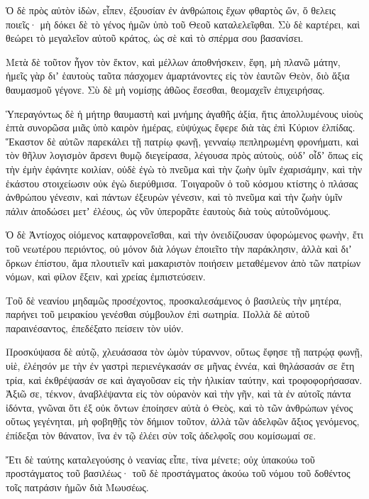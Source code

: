 {Ὁ δὲ πρὸς αὐτὸν ἰδὼν, εἶπεν, ἐξουσίαν ἐν ἀνθρώποις ἔχων φθαρτὸς ὤν, ὅ θελεις ποιεῖς· μὴ δόκει δὲ τὸ γένος ἡμῶν ὑπὸ τοῦ Θεοῦ καταλελεῖφθαι.
Σὺ δὲ καρτέρει, καὶ θεώρει τὸ μεγαλεῖον αὐτοῦ κράτος, ὡς σὲ καὶ τὸ σπέρμα σου βασανίσει.
\par }{\PP {}Μετὰ δὲ τοῦτον ἦγον τὸν ἕκτον, καὶ μέλλων ἀποθνήσκειν, ἔφη, μὴ πλανῶ μάτην, ἡμεῖς γὰρ διʼ ἑαυτοὺς ταῦτα πάσχομεν ἁμαρτάνοντες εἰς τὸν ἑαυτῶν Θεὸν, διὸ ἄξια θαυμασμοῦ γέγονε.
Σὺ δὲ μὴ νομίσῃς ἀθῶος ἔσεσθαι, θεομαχεῖν ἐπιχειρήσας.
\par }{\PP {}Ὑπεραγόντως δὲ ἡ μήτηρ θαυμαστὴ καὶ μνήμης ἀγαθῆς ἀξία, ἥτις ἀπολλυμένους υἱοὺς ἑπτὰ συνορῶσα μιᾶς ὑπὸ καιρὸν ἡμέρας, εὐψύχως ἔφερε διὰ τὰς ἐπὶ Κύριον ἐλπίδας.
Ἕκαστον δὲ αὐτῶν παρεκάλει τῇ πατρίῳ φωνῇ, γενναίῳ πεπληρωμένη φρονήματι, καὶ τὸν θῆλυν λογισμὸν ἄρσενι θυμῷ διεγείρασα, λέγουσα πρὸς αὐτοὺς,
οὐδʼ οἶδʼ ὅπως εἰς τὴν ἐμὴν ἐφάνητε κοιλίαν, οὐδὲ ἐγὼ τὸ πνεῦμα καὶ τὴν ζωὴν ὑμῖν ἐχαρισάμην, καὶ τὴν ἑκάστου στοιχείωσιν οὐκ ἐγὼ διερύθμισα.
Τοιγαροῦν ὁ τοῦ κόσμου κτίστης ὁ πλάσας ἀνθρώπου γένεσιν, καὶ πάντων ἐξευρὼν γένεσιν, καὶ τὸ πνεῦμα καὶ τὴν ζωὴν ὑμῖν πάλιν ἀποδώσει μετʼ ἐλέους, ὡς νῦν ὑπερορᾶτε ἑαυτοὺς διὰ τοὺς αὐτοῦνόμους.
\par }{\PP {}Ὁ δὲ Ἀντίοχος οἰόμενος καταφρονεῖσθαι, καὶ τὴν ὀνειδίζουσαν ὑφορώμενος φωνὴν, ἔτι τοῦ νεωτέρου περιόντος, οὐ μόνον διὰ λόγων ἐποιεῖτο τὴν παράκλησιν, ἀλλὰ καὶ διʼ ὅρκων ἐπίστου, ἅμα πλουτιεῖν καὶ μακαριστὸν ποιήσειν μεταθέμενον ἀπὸ τῶν πατρίων νόμων, καὶ φίλον ἕξειν, καὶ χρείας ἐμπιστεύσειν.
\par }{\PP {}Τοῦ δὲ νεανίου μηδαμῶς προσέχοντος, προσκαλεσάμενος ὁ βασιλεὺς τὴν μητέρα, παρήνει τοῦ μειρακίου γενέσθαι σύμβουλον ἐπὶ σωτηρία.
Πολλὰ δὲ αὐτοῦ παραινέσαντος, ἐπεδέξατο πείσειν τὸν υἱόν.
\par }{\PP {}Προσκύψασα δὲ αὐτῷ, χλευάσασα τὸν ὠμὸν τύραννον, οὕτως ἔφησε τῇ πατρῴᾳ φωνῇ, υἱὲ, ἐλέησόν με τὴν ἐν γαστρὶ περιενέγκασάν σε μῆνας ἐννέα, καὶ θηλάσασάν σε ἔτη τρία, καὶ ἐκθρέψασάν σε καὶ ἀγαγοῦσαν εἰς τὴν ἡλικίαν ταύτην, καὶ τροφοφορήσασαν.
Ἀξιῶ σε, τέκνον, ἀναβλέψαντα εἰς τὸν οὐρανὸν καὶ τὴν γῆν, καὶ τὰ ἐν αὐτοῖς πάντα ἰδόντα, γνῶναι ὅτι ἐξ οὐκ ὄντων ἐποίησεν αὐτὰ ὁ Θεὸς, καὶ τὸ τῶν ἀνθρώπων γένος οὕτως γεγένηται,
μὴ φοβηθῇς τὸν δήμιον τοῦτον, ἀλλὰ τῶν ἀδελφῶν ἄξιος γενόμενος, ἐπίδεξαι τὸν θάνατον, ἵνα ἐν τῷ ἐλέει σὺν τοῖς ἀδελφοῖς σου κομίσωμαί σε.
\par }{\PP {}Ἔτι δὲ ταύτης καταλεγούσης ὁ νεανίας εἶπε, τίνα μένετε; οὐχ ὑπακούω τοῦ προστάγματος τοῦ βασιλέως· τοῦ δὲ προστάγματος ἀκούω τοῦ νόμου τοῦ δοθέντος τοῖς πατράσιν ἡμῶν διὰ Μωυσέως.
}
